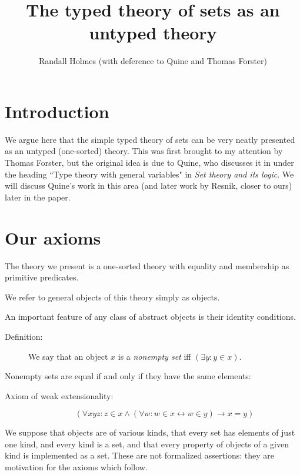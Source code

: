 \documentclass[12pt]{article}
\title{The typed theory of sets as an untyped theory}
\author{Randall Holmes (with deference to Quine and Thomas Forster)}
\begin{document}
\maketitle

\tableofcontents

\section{Introduction}

We argue here that the simple typed theory of sets can be very neatly presented as an untyped (one-sorted) theory.  This was first brought to my attention by Thomas Forster, but the original idea is due to Quine, who discusses it in under the heading ``Type theory with general variables" in {\em Set theory and its logic\/}.   We will discuss Quine's work in this area (and later work by Resnik, closer to ours) later in the paper.

\section{Our axioms}

The theory we present is a one-sorted theory with equality and membership as primitive predicates.

We refer to general objects of this theory simply as objects.

An important feature of any class of abstract objects is their identity conditions.

\begin{description}

\item[Definition:]  We say that an object $x$ is a {\em nonempty set\/} iff $(\exists y:y \in x)$.

\end{description}

Nonempty sets are equal if and only if they have the same elements:

\begin{description}

\item[Axiom of weak extensionality:]  $$(\forall xyz:z \in x \wedge (\forall w:w \in x \leftrightarrow w \in y) \rightarrow x=y)$$

\end{description}

We suppose that objects are of various kinds, that every set has elements of just one kind, and every kind is a set,
and that every property of objects of a given kind is implemented as a set.  These are not formalized assertions:  they are motivation for the axioms which follow.
\end{document}
